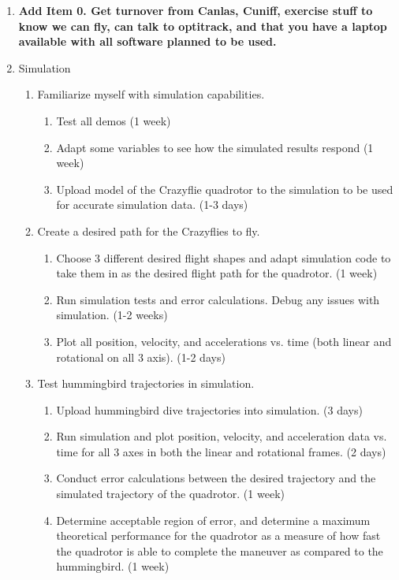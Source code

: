 \documentclass[onecolumn,10pt]{IEEEtran}
\begin{document}
\begin{enumerate}
\item \textbf{Add Item 0. Get turnover from Canlas, Cuniff, exercise stuff to know we can fly, can talk to optitrack, and that you have a laptop available with all software planned to be used.}

\item Simulation
\begin{enumerate}
\item Familiarize myself with simulation capabilities.
\begin{enumerate}
\item Test all demos (1 week)
 \item Adapt some variables to see how the simulated results respond (1 week)
\item Upload model of the Crazyflie quadrotor to the simulation to be used for accurate simulation data. (1-3 days) 
\end{enumerate}

\item Create a desired path for the Crazyflies to fly.
\begin{enumerate}
\item Choose 3 different desired flight shapes and adapt simulation code to take them in as the desired flight path for the quadrotor. (1 week)
\item Run simulation tests and error calculations. Debug any issues with simulation. (1-2 weeks)
\item Plot all position, velocity, and accelerations vs. time (both linear and rotational on all 3 axis). (1-2 days)
\end{enumerate}

\item Test hummingbird trajectories in simulation.
\begin{enumerate}
\item Upload hummingbird dive trajectories into simulation. (3 days)
 \item Run simulation and plot position, velocity, and acceleration data vs. time for all 3 axes in both the linear and rotational frames. (2 days)
\item Conduct error calculations between the desired trajectory and the simulated trajectory of the quadrotor. (1 week)
\item Determine acceptable region of error, and determine a maximum theoretical performance for the quadrotor as a measure of how fast the quadrotor is able to complete the maneuver as compared to the hummingbird. (1 week)
\end{enumerate}
\end{enumerate}
 

\end{enumerate}
\end{document}
